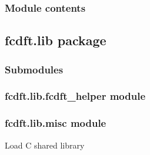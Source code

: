 \documentclass[letterpaper,10pt,english]{sphinxmanual}
\begin{document}
\begin{fulllineitems}
\label{\detokenize{fcdft.jellium:fcdft.jellium.jellium.kernel}}
\pysigstartsignatures
\pysiglinewithargsret
{}
{}
{}
\pysigstopsignatures
\end{fulllineitems}



\subsubsection{Module contents}
\label{\detokenize{fcdft.jellium:module-fcdft.jellium}}\label{\detokenize{fcdft.jellium:module-contents}}
\sphinxstepscope


\subsection{fcdft.lib package}
\label{\detokenize{fcdft.lib:fcdft-lib-package}}\label{\detokenize{fcdft.lib::doc}}

\subsubsection{Submodules}
\label{\detokenize{fcdft.lib:submodules}}

\subsubsection{fcdft.lib.fcdft\_helper module}
\label{\detokenize{fcdft.lib:fcdft-lib-fcdft-helper-module}}

\subsubsection{fcdft.lib.misc module}
\label{\detokenize{fcdft.lib:module-fcdft.lib.misc}}\label{\detokenize{fcdft.lib:fcdft-lib-misc-module}}

\begin{fulllineitems}
\label{\detokenize{fcdft.lib:fcdft.lib.misc.load_library}}
\pysigstartsignatures
\pysiglinewithargsret
{}
{}
{}
\pysigstopsignatures
\sphinxAtStartPar
Load C shared library

\end{fulllineitems}
\end{document}
